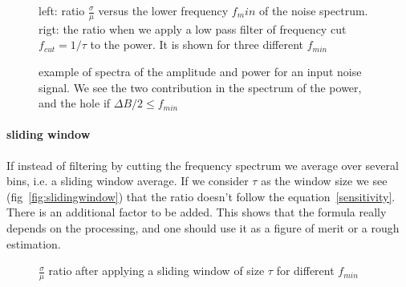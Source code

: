 \begin{figure}[!ht]
  \centering
  \hspace*{-3ex}
  \caption{left: ratio $\frac{\sigma}{\mu}$ versus the lower frequency
    $f_min$ of the noise spectrum. rigt: the ratio when we apply a low
    pass filter of frequency cut $f_{cut}= 1/\tau$ to the power. It is
    shown for three different $f_{min}$}
  \label{fig:bw}
\end{figure}

\begin{figure}[!ht]
  \centering
  \hspace*{-3ex}
  \caption{example of spectra of the  amplitude and power for an input
    noise signal. We see the two contribution in the spectrum of the power, and the hole if $\Delta B/2 \leq f_{min}$}
  \label{fig:fft}
\end{figure}


\paragraph{sliding window}
If instead of  filtering by cutting the frequency  spectrum we average
over  several bins,  i.e. a  sliding window  average.  If  we consider
$\tau$ as  the window size we  see (fig~\ref{fig:slidingwindow}) that
the ratio  doesn't follow the equation~\ref{sensitivity}.  There is an
additional factor  to be  added.  This shows  that the  formula really
depends on the processing, and one  should use it as a figure of merit
or a rough estimation.
\begin{figure}[!ht]
  \centering
  \hspace*{-3ex}
  \caption{$\frac{\sigma}{\mu}$ ratio after  applying a sliding window
    of size $\tau$ for different $f_{min}$}
  \label{fig:slidingwidow}
\end{figure}
